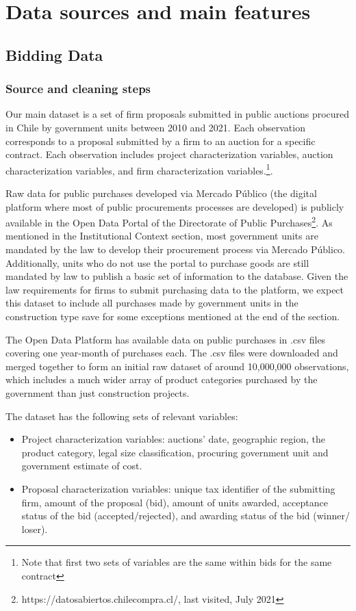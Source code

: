 
\chapter{Data sources and main features}

\section{Bidding Data}
\subsection{Source and cleaning steps}
Our main dataset is a set of firm proposals submitted in public auctions procured in Chile by government units between 2010 and 2021. Each observation corresponds to a proposal submitted by a firm to an auction for a specific contract. Each observation includes project characterization variables, auction characterization variables, and firm characterization variables.\footnote{Note that first two sets of variables are the same within bids for the same contract}.

Raw data for public purchases developed via Mercado Público (the digital platform where most of public procurements processes are developed) is publicly available in the Open Data Portal of the Directorate of Public Purchases\footnote{https://datosabiertos.chilecompra.cl/, last visited, July 2021}. As mentioned in the Institutional Context section, most government units are mandated by the law to develop their procurement process via Mercado Público. Additionally, units who do not use the portal to purchase goods are still mandated by law to publish a basic set of information to the database. Given the law requirements for firms to submit purchasing data to the platform, we expect this dataset to include all purchases made by government units in the construction type save for some exceptions mentioned at the end of the section.

The Open Data Platform has available data on public purchases in .csv files covering one year-month of purchases each. The .csv files were downloaded and merged together to form an initial raw dataset of around 10,000,000 observations, which includes a much wider array of product categories purchased by the government than just construction projects.

The dataset has the following sets of relevant variables:
\begin{itemize}[itemsep=0.5pt]
  \item Project characterization variables: auctions’ date, geographic region, the product category, legal size classification, procuring government unit and government estimate of cost.
  \item Proposal characterization variables: unique tax identifier of the submitting firm, amount of the proposal (bid), amount of units awarded, acceptance status of the bid (accepted/rejected), and awarding status of the bid (winner/ loser).
\end{itemize}

